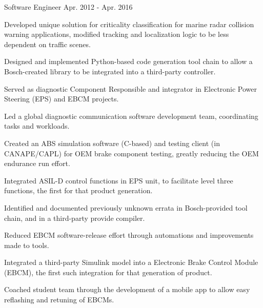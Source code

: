 \begin{cventries}
  \cventry
    {Software Engineer} %
    {} %
    {} %
    {Apr. 2012 - Apr. 2016} %
    {
      \begin{cvitems} %
        \item {Developed unique solution for criticality classification for marine radar collision warning applications, modified tracking and localization logic to be less dependent on traffic scenes.}
        \item {Designed and implemented Python-based code generation tool chain to allow a Bosch-created library to be integrated into a third-party controller.}
        \item {Served as diagnostic Component Responsible and integrator in Electronic Power Steering (EPS) and EBCM projects.}
        \item {Led a global diagnostic communication software development team, coordinating tasks and workloads.}
        \iflongform     
        \item {Created an ABS simulation software (C-based) and testing client (in CANAPE/CAPL) for OEM brake component testing, greatly reducing the OEM endurance run effort.}
        \item {Integrated ASIL-D control functions in EPS unit, to facilitate level three functions, the first for that product generation.}
        \item {Identified and documented previously unknown errata in Bosch-provided tool chain, and in a third-party provide compiler.}
        \item {Reduced EBCM software-release effort through automations and improvements made to tools.}
        \item {Integrated a third-party Simulink model into a Electronic Brake Control Module (EBCM), the first such integration for that generation of product.}
        \item {Coached student team through the development of a mobile app to allow easy reflashing and retuning of EBCMs.}
        \fi
      \end{cvitems}
    }


\end{cventries}
